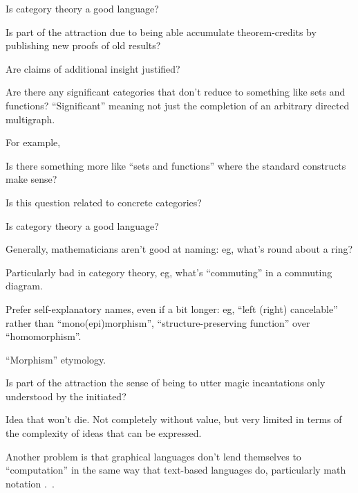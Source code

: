 \documentclass[11pt,openany]{article}
\begin{document}
Is category theory a good language?~\cite{wiki:Abstract-nonsense-2020}

Is part of the attraction due to being able accumulate
theorem-credits by publishing
new proofs of old results?

Are claims of additional insight justified?

Are there any significant categories 
that don't reduce to something like sets and functions?
``Significant'' meaning not just the completion of an arbitrary
directed multigraph.

For example, 

Is there something more like ``sets and functions'' where
the standard constructs make sense?

Is this question related to concrete 
categories?~\cite{wiki:concrete-category-2020}

\label{sec:Naming}

Is category theory a good language?~\cite{wiki:Abstract-nonsense-2020}

Generally, mathematicians aren't good at naming:
eg, what's round about a ring?

Particularly bad in category theory, eg, 
what's ``commuting'' in a commuting diagram.

Prefer self-explanatory names, even if a bit longer:
eg, ``left (right) cancelable'' rather than ``mono(epi)morphism'',
``structure-preserving function'' over ``homomorphism''.

``Morphism'' etymology.

Is part of the attraction the sense of being to utter magic 
incantations only understood by the initiated?

 
\label{sec:Graphical-languages}

Idea that won't die. 
Not completely without value, 
but very limited in terms of the complexity of ideas that can be
expressed.

Another problem is that graphical languages don't lend themselves
to ``computation''
in the same way that text-based languages do,
particularly math notation .~\cite{dutilh_novaes_2012}.

\setcounter{currentlevel}{\value{baseSectionLevel}}
\label{sec:Foundational-Sketch}
\end{document}
